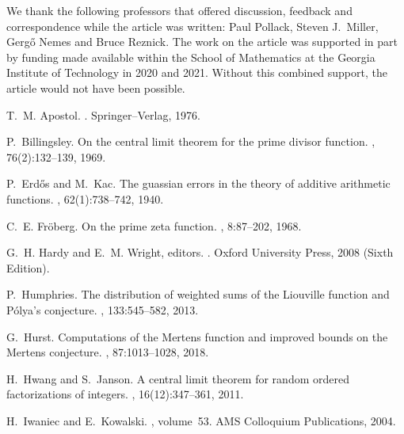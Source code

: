\documentclass[11pt,reqno,a4letter]{article}
\numberwithin{figure}{section}
\numberwithin{table}{section}
\theoremstyle{plain}
\numberwithin{theorem}{section}
\theoremstyle{definition}
\begin{document}
We thank the following professors that offered 
discussion, feedback and correspondence while the article was written: 
Paul Pollack, Steven J.~Miller, Gerg\H{o} Nemes and Bruce Reznick. 
The work on the article was supported in part by 
funding made available within the School of Mathematics at the 
Georgia Institute of Technology in 2020 and 2021. 
Without this combined support, the article would not have been possible.

\newpage 
\renewcommand{\refname}{References} 


\begin{thebibliography}{10}

T.~M. Apostol.
.
\newblock Springer--Verlag, 1976.

P.~Billingsley.
\newblock On the central limit theorem for the prime divisor function.
, 76(2):132--139, 1969.

P.~Erd{\H{o}}s and M.~Kac.
\newblock The guassian errors in the theory of additive arithmetic functions.
, 62(1):738--742, 1940.

C.~E. Fr{\"{o}}berg.
\newblock On the prime zeta function.
, 8:87--202, 1968.

G.~H. Hardy and E.~M. Wright, editors.
.
\newblock Oxford University Press, 2008 (Sixth Edition).

P.~Humphries.
\newblock The distribution of weighted sums of the {L}iouville function and
  {P}\'{o}lya's conjecture.
, 133:545--582, 2013.

G.~Hurst.
\newblock Computations of the {M}ertens function and improved bounds on the
  {M}ertens conjecture.
, 87:1013--1028, 2018.

H.~Hwang and S.~Janson.
\newblock A central limit theorem for random ordered factorizations of
  integers.
, 16(12):347--361, 2011.

H.~Iwaniec and E.~Kowalski.
, volume~53.
\newblock AMS Colloquium Publications, 2004.


\end{thebibliography}
\end{document}
